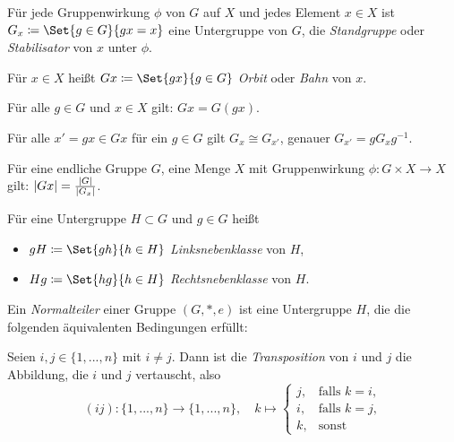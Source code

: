 \documentclass{cheat-sheet}
\begin{document}
\begin{defn}
  Für jede Gruppenwirkung $\phi$ von $G$ auf $X$ und jedes Element $x \in X$ ist $G_x \coloneqq \Set{ g \in G }{ gx = x }$ eine Untergruppe von $G$, die \emph{Standgruppe} oder \emph{Stabilisator} von $x$ unter $\phi$.
\end{defn}

\begin{defn}
  Für $x \in X$ heißt $Gx \coloneqq \Set{ gx }{ g \in G }$ \emph{Orbit} oder \emph{Bahn} von $x$.
\end{defn}

\begin{bem}
  Für alle $g \in G$ und $x \in X$ gilt: $Gx = G(gx)$.
\end{bem}

\begin{bem}
  Für alle $x' = gx \in Gx$ für ein $g \in G$ gilt $G_x \cong G_{x'}$, genauer
  $G_{x'} = g G_x g^{-1}$.
\end{bem}

\begin{satz}
  Für eine endliche Gruppe $G$, eine Menge $X$ mit Gruppenwirkung $\phi : G \times X \to X$ gilt: $\lvert Gx\rvert = \frac{\lvert G\rvert}{\lvert G_x\rvert}$.
\end{satz}

\begin{defn}
  Für eine Untergruppe $H \subset G$ und $g \in G$ heißt
  \begin{itemize}
    \item $gH \coloneqq \Set{ gh }{ h \in H }$ \emph{Linksnebenklasse} von $H$,
    \item $Hg \coloneqq \Set{ hg }{ h \in H }$ \emph{Rechtsnebenklasse} von $H$.
  \end{itemize}
\end{defn}

\begin{defn}
  Ein \emph{Normalteiler} einer Gruppe $(G, *, e)$ ist eine Untergruppe $H$, die die folgenden äquivalenten Bedingungen erfüllt:
  \begin{itemize}
  \end{itemize}
\end{defn}


\begin{defn}
  Seien $i, j \in \{ 1, ..., n \}$ mit $i \not= j$. Dann ist die \emph{Transposition} von $i$ und $j$ die Abbildung, die $i$ und $j$ vertauscht, also
  \[
    (ij) : \{ 1, ..., n \} \to \{ 1, ..., n \}, \quad k \mapsto \begin{cases}
      j, & \text{falls $k = i$,}\\
      i, & \text{falls $k = j$,}\\
      k, & \text{sonst}
    \end{cases}
  \]
\end{defn}
\end{document}
